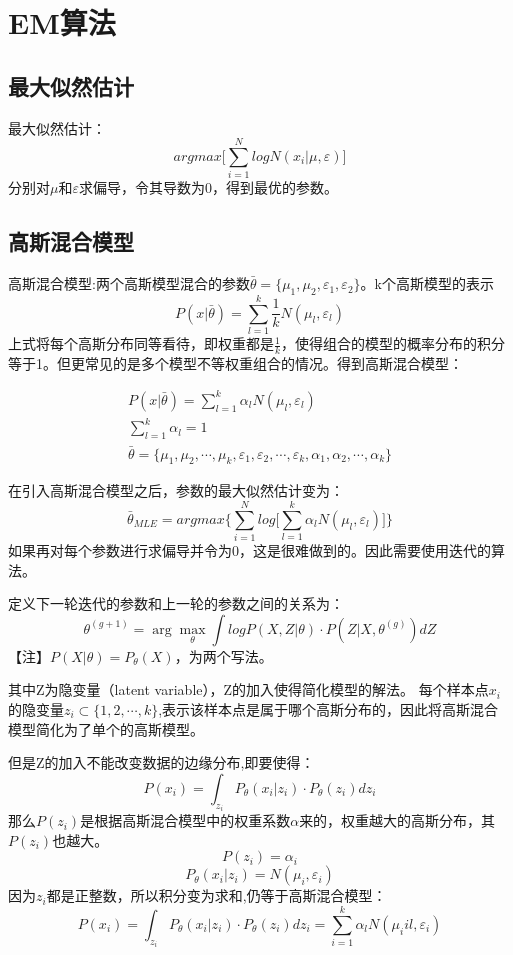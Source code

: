 \documentclass[UTF8]{ctexart} %
\begin{document}
	\section{EM算法}
		\subsection{最大似然估计}
		最大似然估计：
		\[argmax\Big[\sum_{i=1}^NlogN(x_i|\mu,\varepsilon)\Big]\]
		分别对$\mu$和$\varepsilon$求偏导，令其导数为0，得到最优的参数。
		
		\subsection{高斯混合模型}
		高斯混合模型:两个高斯模型混合的参数$\bar{\theta}=\{\mu_1,\mu_2,\varepsilon_1,\varepsilon_2\}$。k个高斯模型的表示
		\[P(x|\bar{\theta}) = \sum_{l=1}^k\frac{1}{k}N(\mu_l,\varepsilon_l)\]
		上式将每个高斯分布同等看待，即权重都是$\frac{1}{k}$，使得组合的模型的概率分布的积分等于1。但更常见的是多个模型不等权重组合的情况。得到高斯混合模型：
		
		\begin{gather}
		P(x|\bar{\theta}) = \sum_{l=1}^k\alpha_lN(\mu_l,\varepsilon_l)\\
		\sum_{l=1}^k\alpha_l=1\\
		\bar{\theta}=\{\mu_1,\mu_2,\cdots,\mu_k,\varepsilon_1,\varepsilon_2,\cdots,\varepsilon_k,\alpha_1,\alpha_2,\cdots,\alpha_k\}
		\end{gather}
		
		在引入高斯混合模型之后，参数的最大似然估计变为：
		\[\bar{\theta}_{MLE} = argmax\Big\{\sum_{i=1}^Nlog\big[\sum_{l=1}^k\alpha_lN(\mu_l,\varepsilon_l)\big]\Big\}\]
		如果再对每个参数进行求偏导并令为0，这是很难做到的。因此需要使用迭代的算法。
		
		定义下一轮迭代的参数和上一轮的参数之间的关系为：
		\[\theta^{(g+1)} = \arg\max_{\theta}\int logP(X,Z|\theta)\cdot P(Z|X,\theta^{(g)})dZ\]
		【注】$P(X|\theta) = P_{\theta}(X)$，为两个写法。
		 
		其中Z为隐变量（latent variable），Z的加入使得简化模型的解法。
		每个样本点$x_i$的隐变量$z_i\subset \{1,2,\cdots ,k\}$,表示该样本点是属于哪个高斯分布的，因此将高斯混合模型简化为了单个的高斯模型。
		
		但是Z的加入不能改变数据的边缘分布,即要使得：
		\[P(x_i) = \int_{z_i}P_\theta(x_i|z_i)\cdot P_\theta(z_i)dz_i\]
		那么$P(z_i)$是根据高斯混合模型中的权重系数$\alpha$来的，权重越大的高斯分布，其$P(z_i)$也越大。
		\[P(z_i) = \alpha_i\]
		\[P_\theta(x_i|z_i) = N(\mu_i,\varepsilon_i)\]
		因为$z_i$都是正整数，所以积分变为求和,仍等于高斯混合模型：
		\[P(x_i) = \int_{z_i}P_\theta(x_i|z_i)\cdot P_\theta(z_i)dz_i = \sum_{i=1}^k\alpha_lN(\mu_iil,\varepsilon_i)\]
		
\end{document}
